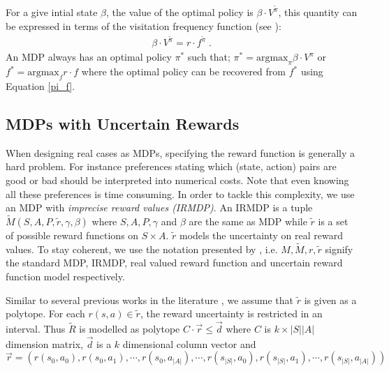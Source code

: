 \documentclass[runningheads,a4paper]{llncs}
\begin{document}
For a give intial state $\beta$, the value of the optimal policy is $\beta \cdot V^{\tilde{\pi}}$, this quantity can be expressed in terms of the visitation frequency function (see \cite{Puterman1994}): 
\begin{align}\label{f-v}
\beta \cdot V^{\tilde{\pi}} = r \cdot f^{\tilde{\pi}}\;.
\end{align}
An MDP always has an optimal policy $\pi^*$ such that; $\pi^* = \text{argmax}_{\pi} \beta \cdot V^{\pi}$ or $f^{*} = \text{argmax}_{f} r \cdot f$ where the optimal policy can be recovered from $f^*$ using Equation \ref{pi_f}. 

\subsection{MDPs with Uncertain Rewards}
When designing real cases as MDPs, specifying the reward function is generally a hard problem. For instance preferences stating which (state, action) pairs are good or bad should be interpreted into numerical costs. Note that even knowing all these preferences is time consuming. In order to
tackle this complexity, we use an MDP with \textit{imprecise reward values (IRMDP)}. An IRMDP \citep{Regan2009} is a tuple $\tilde{M}(S, A, P, \tilde{r}, \gamma, \beta)$ where $S, A, P, \gamma$ and $\beta$ are the same as MDP while $\tilde{r}$ is a set of possible reward functions on $S \times A$. $\tilde{r}$ models the uncertainty on real reward values. To stay coherent, we use the notation presented by , i.e. $M, \tilde{M}, r, \tilde{r}$ signify the standard MDP, IRMDP, real valued reward function and uncertain reward function model respectively.  

Similar to several previous works in the literature \cite{Ahmed2017,alizadeh2015,benavent2018,Regan2009,Weng2013}, we assume that $\tilde{r}$ is given as a polytope. For each $r(s,a) \in \tilde{r}$, the reward uncertainty is restricted in an interval. Thus $\tilde{R}$ is modelled as polytope $C \cdot \overrightarrow{r} \leq \overrightarrow{d}$ where $C$ is $k \times |S||A|$ dimension matrix, $\overrightarrow{d}$ is a $k$ dimensional column vector and $\overrightarrow{r} = (r(s_0,a_0), r(s_0,a_1), \cdots, r(s_0,a_{|A|}), \cdots, r( s_{|S|},a_0), r(s_{|S|},a_1), \cdots, r(s_{|S|},a_{|A|}) )$
 
\end{document}
